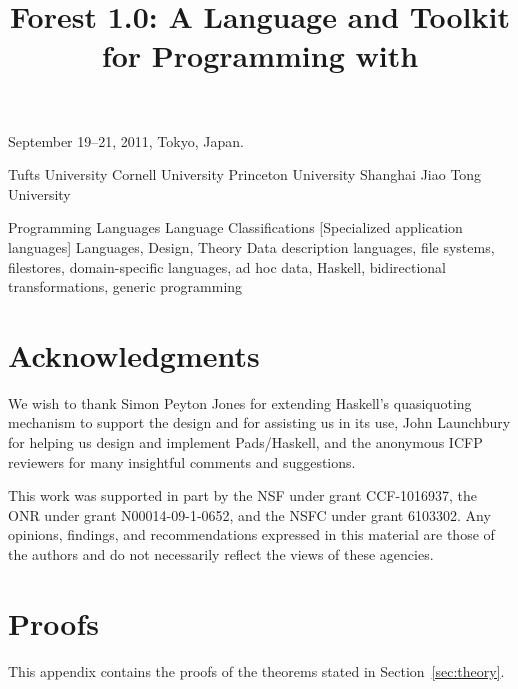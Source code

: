 \documentclass[natbib]{sigplanconf}
\newif\iftr\trtrue              %
\newif\ifappendix\appendixtrue   %
\begin{document}


 {September 19--21, 2011, Tokyo, Japan.}

\title{Forest\iftr{} 1.0\fi: A Language and Toolkit for Programming with \Filestores{}}

	   {Tufts University}{}
           {Cornell University}{}
           {Princeton University}{}
           {Shanghai Jiao Tong University}{}

\maketitle{}

\begin{abstract}  

\end{abstract}

  {Programming Languages}
  {Language Classifications}
  [Specialized application languages]
\terms
Languages, Design, Theory
\keywords
Data description languages, 
file systems, 
filestores,
domain-specific languages, 
ad hoc data, 
Haskell, 
bidirectional transformations,
generic programming











\section*{Acknowledgments}

We wish to thank Simon Peyton Jones for extending Haskell's
quasiquoting mechanism to support the \forest{} design and for
assisting us in its use, John Launchbury for helping us design and
implement Pads/Haskell, and the anonymous ICFP reviewers for many
insightful comments and suggestions. 

This work was supported in part by the NSF under grant CCF-1016937,
the ONR under grant N00014-09-1-0652, and the NSFC under grant
6103302. Any opinions, findings, and recommendations expressed in this
material are those of the authors and do not necessarily reflect the
views of these agencies.


\balance


\ifappendix
\newpage
\appendix
\onecolumn

\closeproofchan
\section{Proofs}

\noindent This appendix contains the proofs of the theorems stated in
Section~\ref{sec:theory}.

\label{sec:proof-appendix}


\newpage

\fi
\end{document}
